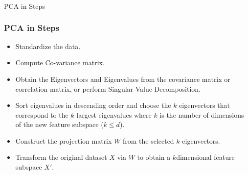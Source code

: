 
\begin{frame}[fragile]\frametitle{}
\begin{center}
{\Large PCA in Steps}
\end{center}
\end{frame}

\begin{frame}[fragile] \frametitle{PCA in Steps} 
\begin{itemize}

\item Standardize the data.
\item Compute Co-variance matrix.
\item Obtain the Eigenvectors and Eigenvalues from the covariance matrix or correlation matrix, or perform Singular Value Decomposition.
\item Sort eigenvalues in descending order and choose the $k$
 eigenvectors that correspond to the $k$ largest eigenvalues where $k$
 is the number of dimensions of the new feature subspace ($k \leq d$).
\item Construct the projection matrix $W$ from the selected $k$  eigenvectors.
\item Transform the original dataset $X$ via $W$ to obtain a $k$dimensional feature subspace $X'$.
\end{itemize}
\end{frame}

